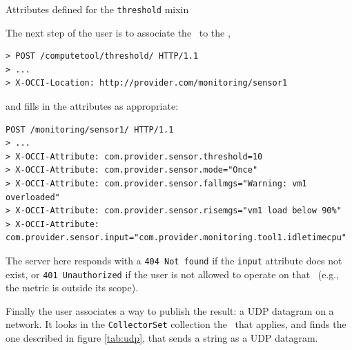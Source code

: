 \documentclass[12pt]{article}  %
\begin{document}
{\begin{table}
\scriptsize
{}

\caption{Attributes defined for the {\tt threshold} mixin \label{tab:vat}}
\end {table}

The next step of the user is to associate the \sens\ to the \mi,

\begin{verbatim}
> POST /computetool/threshold/ HTTP/1.1
> ...
> X-OCCI-Location: http://provider.com/monitoring/sensor1
\end{verbatim}
 
and fills in the attributes as appropriate:

\begin{verbatim}
POST /monitoring/sensor1/ HTTP/1.1
> ...
> X-OCCI-Attribute: com.provider.sensor.threshold=10
> X-OCCI-Attribute: com.provider.sensor.mode="Once"
> X-OCCI-Attribute: com.provider.sensor.fallmgs="Warning: vm1 overloaded"
> X-OCCI-Attribute: com.provider.sensor.risemgs="vm1 load below 90%"
> X-OCCI-Attribute: com.provider.sensor.input="com.provider.monitoring.tool1.idletimecpu"
\end{verbatim}

The server here responds with a {\tt 404 Not found} if the {\tt input} attribute does not exist, or {\tt 401 Unauthorized} if the user is not allowed to operate on that \rs\ (e.g., the metric is outside its scope).

Finally the user associates a way to publish the result: a UDP datagram on a network. It looks in the {\tt CollectorSet} collection the \mi\ that applies, and finds the one described in figure \ref{tab:udp}, that sends a string as a UDP datagram.

\begin{table}
\scriptsize
{}


\end{table}}
\end{document}
